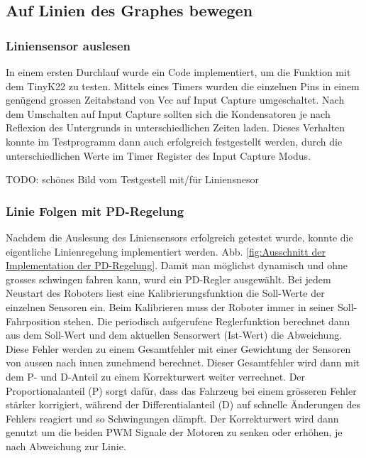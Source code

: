 \newpage

\subsection{Auf Linien des Graphes bewegen}

\subsubsection{Liniensensor auslesen}

In einem ersten Durchlauf wurde ein Code implementiert, um die Funktion mit dem TinyK22 zu testen. Mittels eines Timers wurden die einzelnen Pins in einem genügend grossen Zeitabstand von Vcc auf Input Capture umgeschaltet. Nach dem Umschalten auf Input Capture sollten sich die Kondensatoren je nach Reflexion des Untergrunds in unterschiedlichen Zeiten laden. Dieses Verhalten konnte im Testprogramm dann auch erfolgreich festgestellt werden, durch die unterschiedlichen Werte im Timer Register des Input Capture Modus.


TODO: schönes Bild vom Testgestell mit/für Liniensnesor

\subsubsection{Linie Folgen mit PD-Regelung}

Nachdem die Auslesung des Liniensensors erfolgreich getestet wurde, konnte die eigentliche Linienregelung implementiert werden. Abb. \ref{fig:Ausschnitt der Implementation der PD-Regelung}. Damit man möglichst dynamisch und ohne grosses schwingen fahren kann, wurd ein PD-Regler ausgewählt. Bei jedem Neustart des Roboters liest eine Kalibrierungsfunktion die Soll-Werte der einzelnen Sensoren ein. Beim Kalibrieren muss der Roboter immer in seiner Soll-Fahrposition stehen. Die periodisch aufgerufene Reglerfunktion berechnet dann aus dem Soll-Wert und dem aktuellen Sensorwert (Ist-Wert) die Abweichung. Diese Fehler werden zu einem Gesamtfehler mit einer Gewichtung der Sensoren von aussen nach innen zunehmend berechnet. Dieser Gesamtfehler wird dann mit dem P- und D-Anteil zu einem Korrekturwert weiter verrechnet. Der Proportionalanteil (P) sorgt dafür, dass das Fahrzeug bei einem grösseren Fehler stärker korrigiert, während der Differentialanteil (D) auf schnelle Änderungen des Fehlers reagiert und so Schwingungen dämpft. Der Korrekturwert wird dann genutzt um die beiden PWM Signale der Motoren zu senken oder erhöhen, je nach Abweichung zur Linie.

